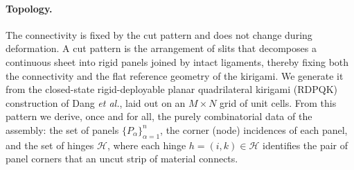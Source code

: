 \documentclass[pdflatex,sn-mathphys-num]{sn-jnl}%
\theoremstyle{thmstyleone}%
\theoremstyle{thmstyletwo}%
\theoremstyle{thmstylethree}%
\begin{document}
\paragraph{Topology.}
The connectivity is fixed by the cut pattern and does not change during
deformation. A cut pattern is the arrangement of slits that decomposes a
continuous sheet into rigid panels joined by intact ligaments, thereby fixing both
the connectivity and the flat reference geometry of the kirigami. We generate it
from the closed-state rigid-deployable planar quadrilateral kirigami (RDPQK)
construction of Dang \emph{et al.}, laid out on an $M \times N$ grid of unit
cells. %
From this pattern we derive, once and for all, the purely combinatorial data of
the assembly: the set of panels $\{P_\alpha\}_{\alpha=1}^{n}$, the corner (node)
incidences of each panel, and the set of hinges $\mathcal{H}$, where each hinge
$h=(i,k)\in\mathcal{H}$ identifies the pair of panel corners that an uncut strip
of material connects.
\end{document}
